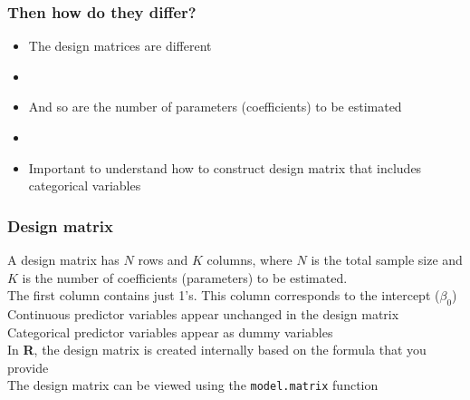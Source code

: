 \documentclass[color=usenames,dvipsnames]{beamer}\usepackage[]{graphicx}\usepackage[]{color}
\newcommand{\inr}[1]{\colorbox{inlinecolor}{\texttt{#1}}}
\begin{document}
\begin{frame}
  \frametitle{Then how do they differ?}
  \begin{itemize}%
  \large
    \item The design matrices are different
    \item[]
    \item And so are the number of parameters (coefficients) to be
      estimated
    \item[]
    \item Important to understand how to construct design matrix that
      includes categorical variables
  \end{itemize}
\end{frame}




\begin{frame}%
  \frametitle{Design matrix}
  A design matrix has $N$ rows and $K$ columns, where $N$ is
      the total sample size and $K$ is the number of coefficients (parameters)
      to be estimated. \\
 \pause
 \vfill
      The first column contains just 1's. This column corresponds
      to the intercept ($\beta_0$) \\
 \pause
 \vfill
      Continuous predictor variables appear unchanged in the design
      matrix \\
 \pause
 \vfill
      Categorical predictor variables appear as dummy variables \\
 \pause
 \vfill
      In {\bf R}, the design matrix is created internally based on
      the formula that you provide \\
 \pause
 \vfill
      The design matrix can be viewed using the \inr{model.matrix} function
\end{frame}
\end{document}
